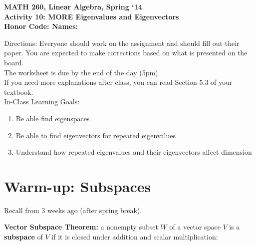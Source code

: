 \documentclass{article}
\begin{document}
\begin{flushleft}
	\bfseries{MATH 260, Linear Algebra, Spring `14}\\
	\bfseries{Activity 10:  MORE Eigenvalues and Eigenvectors}\\
	\bfseries{Honor Code:} \hspace{3.5in}\bfseries{Names:}\\
\end{flushleft}
\begin{flushleft}
\vspace{.75in}
Directions:  Everyone should work on the assignment and should fill out their paper.  You are expected to make corrections based on what is presented on the board.  \\
\large The worksheet is due by the end of the day (5pm). \normalsize \\ 
If you need more explanations after class, you can read Section 5.3 of your textbook.\\
\vspace{0.1in}
\Large
In-Class Learning Goals:\\
\normalsize
\begin{enumerate}
\item Be able find eigenspaces
\item Be able to find eigenvectors for repeated eigenvalues
\item Understand how repeated eigenvalues and their eigenvectors affect dimension

\end{enumerate}

\vspace{0.1in}

\section*{Warm-up:  Subspaces}
Recall from 3 weeks ago (after spring break).

\vspace{0.1in}

\textbf{Vector Subspace Theorem:} a nonempty subset $W$ of a vector space $V$ is a \textbf{subspace} of $V$ if it is closed under addition and scalar multiplication:

\vspace{0.2in}


\end{flushleft}
\end{document}
